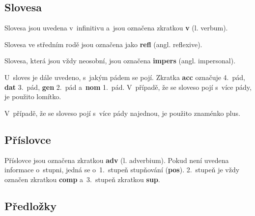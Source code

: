 \blspace
  \dicEntry {} 
  \dicEntry {}  
  \dicEntry {}  
\blspace

\subsection*{Slovesa}

Slovesa jsou uvedena v~infinitivu a~jsou označena zkratkou \textbf{v} (l. verbum).

\blspace
  \dicEntry {} 
\blspace

Slovesa ve středním rodě jsou označena jako \textbf{refl} (angl. reflexive).

\blspace
  \dicEntry {}  
\blspace

Slovesa, která jsou vždy neosobní, jsou označena \textbf{impers} (angl. impersonal).

\blspace
  \dicEntry {}  
\blspace

U~sloves je dále uvedeno, s~jakým pádem se pojí. Zkratka \textbf{acc} označuje 4.~pád, \textbf{dat} 3.~pád, \textbf{gen} 2.~pád a~\textbf{nom} 1.~pád. V~případě, že se sloveso pojí s~více pády, je použito lomítko.

\blspace
  \dicEntry {}  
\blspace

V~případě, že se sloveso pojí s~více pády najednou, je použito znaménko plus.

\blspace
  \dicEntry {}  
\blspace

\subsection*{Příslovce}

Příslovce jsou označena zkratkou \textbf{adv} (l. adverbium). Pokud není uvedena informace o~stupni, jedná se o~1.~stupeň stupňování (\textbf{pos}). 2.~stupeň je vždy označen zkratkou \textbf{comp} a~3.~stupeň zkratkou \textbf{sup}.

\blspace
  \dicEntry {} 
  \dicEntry {}  
  \dicEntry {}  
\blspace

\subsection*{Předložky}

